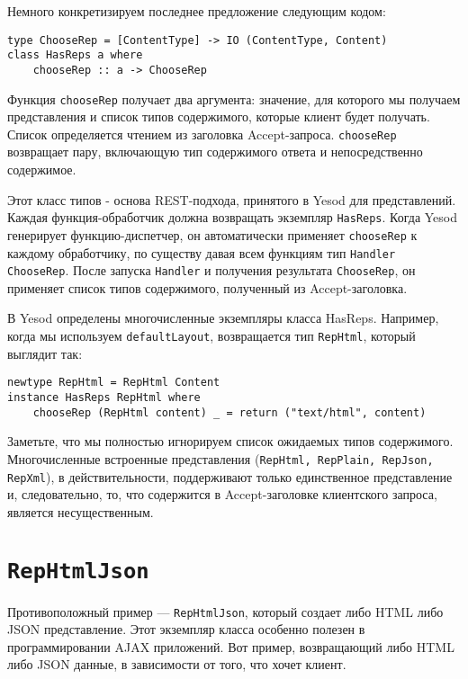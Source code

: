 Немного конкретизируем последнее предложение следующим кодом:

\begin{lstlisting}
type ChooseRep = [ContentType] -> IO (ContentType, Content)
class HasReps a where
    chooseRep :: a -> ChooseRep
\end{lstlisting}

Функция \lstinline`chooseRep` получает два аргумента: значение, для которого мы получаем представления и список типов содержимого, которые клиент будет получать. Список определяется чтением из заголовка Accept-запроса. \lstinline`chooseRep` возвращает пару, включающую тип содержимого ответа и непосредственно содержимое.

Этот класс типов - основа REST-подхода, принятого в Yesod для представлений. Каждая функция-обработчик должна возвращать экземпляр \lstinline`HasReps`. Когда Yesod генерирует функцию-диспетчер, он автоматически применяет \lstinline'chooseRep' к каждому обработчику, по существу давая всем функциям тип \lstinline'Handler ChooseRep'. После  запуска \lstinline'Handler' и получения результата \lstinline'ChooseRep',  он применяет список типов содержимого, полученный из Accept-заголовка.

В Yesod определены многочисленные экземпляры класса HasReps. Например, когда мы используем \lstinline`defaultLayout`, возвращается тип \lstinline'RepHtml', который выглядит так:

\begin{lstlisting}
newtype RepHtml = RepHtml Content
instance HasReps RepHtml where
    chooseRep (RepHtml content) _ = return ("text/html", content)
\end{lstlisting}

Заметьте, что мы полностью игнорируем список ожидаемых типов содержимого. Многочисленные встроенные представления (\lstinline'RepHtml, RepPlain, RepJson, RepXml'), в действительности, поддерживают только единственное представление и, следовательно, то, что содержится в Accept-заголовке клиентского запроса, является несущественным.

\section{\lstinline'RepHtmlJson'}

Противоположный пример --- \lstinline'RepHtmlJson', который создает либо HTML либо JSON представление. Этот экземпляр класса особенно полезен в программировании AJAX приложений. Вот пример, возвращающий либо HTML либо JSON данные, в зависимости от того, что хочет клиент. 

